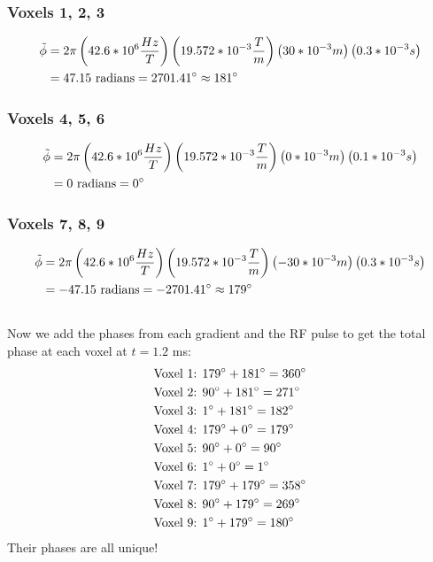 \documentclass{article}
\begin{document}
\subsubsection*{Voxels 1, 2, 3}
\begin{align*}
    \tilde{\phi} &= 
    2\pi \left(42.6 * 10^{6} \frac{Hz}{T}\right)
    \left(19.572 * 10^{-3} \frac{T}{m} \right)
    \left(30 * 10^{-3} m \right)
    \left(0.3 * 10^{-3} s \right) \\
    &= 47.15 \textrm{ radians} = 2701.41\degree \approx 181\degree
\end{align*}
\subsubsection*{Voxels 4, 5, 6}
\begin{align*}
    \tilde{\phi} &= 
    2\pi \left(42.6 * 10^{6} \frac{Hz}{T}\right)
    \left(19.572 * 10^{-3} \frac{T}{m} \right)
    \left(0 * 10^{-3} m \right)
    \left(0.1 * 10^{-3} s \right) \\
    &= 0 \textrm{ radians} = 0\degree
\end{align*}
\subsubsection*{Voxels 7, 8, 9}
\begin{align*}
    \tilde{\phi} &= 
    2\pi \left(42.6 * 10^{6} \frac{Hz}{T}\right)
    \left(19.572 * 10^{-3} \frac{T}{m} \right)
    \left(-30 * 10^{-3} m \right)
    \left(0.3 * 10^{-3} s \right) \\
    &= -47.15 \textrm{ radians} = -2701.41\degree \approx 179\degree
\end{align*}
\subsection*{}
Now we add the phases from each gradient and the RF pulse to get the total phase at each voxel at $t = 1.2$ ms:
\begin{align*}
    &\textrm{Voxel 1: } 179\degree + 181\degree = 360\degree \\
    &\textrm{Voxel 2: } 90\degree + 181\degree = 271\degree \\
    &\textrm{Voxel 3: } 1\degree + 181\degree = 182\degree \\
    &\textrm{Voxel 4: } 179\degree + 0\degree = 179\degree \\
    &\textrm{Voxel 5: } 90\degree + 0\degree = 90\degree \\
    &\textrm{Voxel 6: } 1\degree + 0\degree = 1\degree \\
    &\textrm{Voxel 7: } 179\degree + 179\degree = 358\degree \\
    &\textrm{Voxel 8: } 90\degree + 179\degree = 269\degree \\
    &\textrm{Voxel 9: } 1\degree + 179\degree = 180\degree
\end{align*}
Their phases are all unique!
\end{document}
